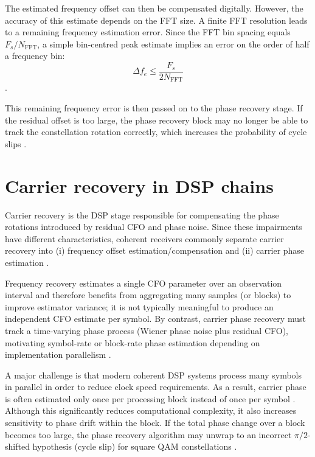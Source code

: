 The estimated frequency offset can then be compensated digitally. However, the accuracy of
this estimate depends on the FFT size. A finite FFT resolution leads to a remaining
frequency estimation error. Since the FFT bin spacing equals $F_s/N_{\mathrm{FFT}}$, a
simple bin-centred peak estimate implies an error on the order of half a frequency bin:
\begin{equation}
\Delta f_e \leq \frac{F_s}{2N_{\mathrm{FFT}}}
\end{equation}
\cite{AnalogDevicesDFT,AgilentNoiseGuide}.

This remaining frequency error is then passed on to the phase recovery stage. If the
residual offset is too large, the phase recovery block may no longer be able to track the
constellation rotation correctly, which increases the probability of cycle slips
\cite{Pfau2009JLT,Kuschnerov2009JLT}.

\section{Carrier recovery in DSP chains}
Carrier recovery is the DSP stage responsible for compensating the phase rotations
introduced by residual CFO and phase noise. Since these impairments have different
characteristics, coherent receivers commonly separate carrier recovery into (i) frequency
offset estimation/compensation and (ii) carrier phase estimation \cite{Savory2010JSTQE,Kuschnerov2009JLT}.

Frequency recovery estimates a single CFO parameter over an observation interval and
therefore benefits from aggregating many samples (or blocks) to improve estimator variance;
it is not typically meaningful to produce an independent CFO estimate per symbol. By
contrast, carrier phase recovery must track a time-varying phase process (Wiener phase
noise plus residual CFO), motivating symbol-rate or block-rate phase estimation depending
on implementation parallelism \cite{Leven2007LPT,Pfau2009JLT}.

A major challenge is that modern coherent DSP systems process many symbols in parallel in
order to reduce clock speed requirements. As a result, carrier phase is often estimated
only once per processing block instead of once per symbol \cite{Kuschnerov2009JLT}. Although
this significantly reduces computational complexity, it also increases sensitivity to phase
drift within the block. If the total phase change over a block becomes too large, the phase
recovery algorithm may unwrap to an incorrect $\pi/2$-shifted hypothesis (cycle slip) for
square QAM constellations \cite{Pfau2009JLT}.

